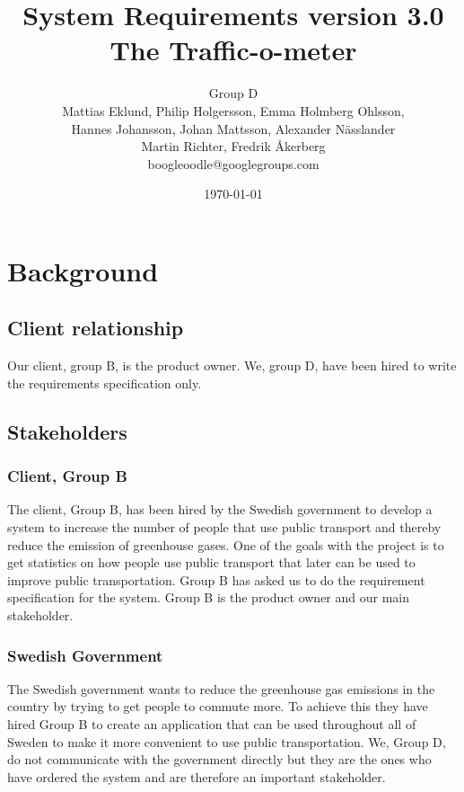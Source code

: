 \documentclass[a4paper]{article}
\title{System Requirements version 3.0\\ The Traffic-o-meter}
\author{Group D\\ Mattias Eklund, Philip Holgersson, Emma Holmberg Ohlsson,\\ Hannes Johansson, Johan Mattsson, Alexander Nässlander\\Martin Richter, Fredrik Åkerberg\\boogleoodle@googlegroups.com}
\date{\today}
\begin{document}
	\maketitle
	\thispagestyle{empty}
	\pagestyle{empty}
	\newpage
	\clearpage
	\tableofcontents
	\newpage
	\setcounter{page}{1}

\pagestyle{fancy}
\renewcommand{\headrulewidth}{0.4pt}
\renewcommand{\footrulewidth}{0.4pt}




	\section{Background} %
	\label{sec:background}
	
		\subsection{Client relationship}
	Our client, group B, is the product owner. We, group D, have been hired to write the requirements specification only.
		\subsection{Stakeholders} %
		\label{sub:stakeholders}
			\subsubsection{Client, Group B}
			The client, Group B, has been hired by the Swedish government to develop a system to increase the number of people that use public transport and thereby reduce the emission of greenhouse gases. One of the goals with the project is to get statistics on how people use public transport that later can be used to improve public transportation. Group B has asked us to do the requirement specification for the system. Group B is the product owner and our main stakeholder.

			\subsubsection{Swedish Government}
			The Swedish government wants to reduce the greenhouse gas emissions in the country by trying to get people to commute more. To achieve this they have hired Group B to create an application that can be used throughout all of Sweden to make it more convenient to use public transportation. We, Group D, do not  communicate with the government directly but they are the ones who have ordered the system and are therefore an important stakeholder. 
\end{document}
